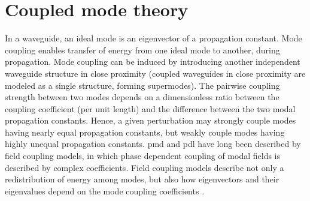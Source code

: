 \documentclass[../report.tex]{subfiles}
\begin{document}
	\section{Coupled mode theory}\label{concept:mode_coupling}
In a waveguide, an ideal mode is an eigenvector of a propagation constant. Mode coupling enables transfer of energy from one ideal mode to another, during propagation. Mode coupling can be induced by introducing another independent waveguide structure in close proximity (coupled waveguides in close proximity are modeled as a single structure, forming supermodes). The pairwise coupling strength between two modes depends on a dimensionless ratio between the coupling coefficient (per unit length) and the difference between the two modal propagation constants. Hence, a given perturbation may strongly couple modes having nearly equal propagation constants, but weakly couple modes having highly unequal propagation constants. \gls{pmd} and \gls{pdl} have long been described by field coupling models, in which phase dependent coupling of modal fields is described by complex coefficients. Field coupling models describe not only a redistribution of energy among modes, but also how eigenvectors and their eigenvalues depend on the mode coupling coefficients \cite{kahn_mode_2012}.
\end{document}

